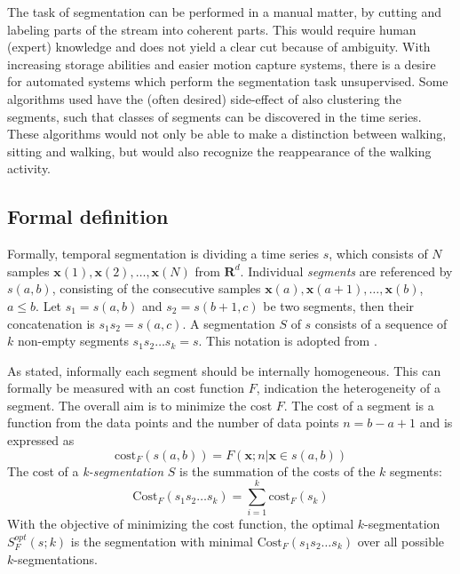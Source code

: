 The task of segmentation can be performed in a manual
matter, by cutting and labeling parts of the stream into coherent parts. This
would require human (expert) knowledge and does not yield a clear cut because
of ambiguity. With increasing storage abilities and easier motion capture
systems, there is a desire for automated systems which perform the
segmentation task unsupervised. Some algorithms used have the (often desired)
side-effect of also clustering the segments, such that classes of segments can
be discovered in the time series. These algorithms would not only be able to
make a distinction between walking, sitting and walking, but would also
recognize the reappearance of the walking activity.

\subsection{Formal definition}
Formally, temporal segmentation is dividing a time series $s$, which consists
of $N$ samples $\mathbf{x}(1),\mathbf{x}(2),\dots,\mathbf{x}(N)$ from
$\mathbf{R}^d$. Individual \emph{segments} are referenced by $s(a,b)$,
consisting of the consecutive samples
$\mathbf{x}(a),\mathbf{x}(a+1),\dots,\mathbf{x}(b)$, $a \le b$. Let $s_1 =
s(a,b)$ and $s_2 = s(b+1,c)$ be two segments, then their concatenation is
$s_1s_2 = s(a,c)$. A segmentation $S$ of $s$ consists of a sequence of $k$
non-empty segments $s_1s_2 \dots s_k = s$.
This notation is adopted from \cite{himberg2001time}.

As stated, informally each segment should be internally homogeneous. This can
formally be measured with an cost function $F$, indication the heterogeneity
of a segment. The overall aim is to minimize the cost $F$. The cost of a
segment is a function from the data points and the number of data points $n =
b - a + 1$ and is expressed as
\begin{equation} \label{eq:segment_cost}
\mathrm{cost}_F (s(a,b)) = F(\mathbf{x};n|\mathbf{x} \in s(a,b))
\end{equation}
The cost of a \emph{k-segmentation} $S$ is the summation of the costs of the
$k$ segments:
\begin{equation} \label{eq:segmentation_cost}
\mathrm{Cost}_F (s_1 s_2 \dots s_k) = \sum_{i=1}^{k} \mathrm{cost}_F (s_k)
\end{equation}
With the objective of minimizing the cost function, the optimal
$k$-segmentation $S_F^\mathit{opt}(s;k)$ is the segmentation with minimal
$\mathrm{Cost}_F(s_1 s_2 \dots s_k)$ over all possible $k$-segmentations.

